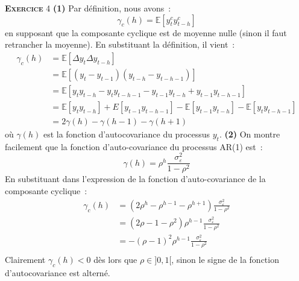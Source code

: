 \documentclass[10pt,a4paper,notitlepage,twocolumn]{article}
\newcommand{\exercice}[1]{\textsc{\textbf{Exercice}} #1}
\begin{document}
\exercice{4} \textbf{(1)} Par définition, nous avons :
\[
\gamma_c(h) = \mathbb E [y^c_ty^c_{t-h}]
\]
en supposant que la composante cyclique est de moyenne nulle (sinon il
faut retrancher la moyenne). En substituant la définition, il vient :
\[
  \begin{split}
    \gamma_c(h) &= \mathbb E [\Delta y_t \Delta y_{t-h}]\\
    &= \mathbb E [(y_t-y_{t-1})(y_{t-h}-y_{t-h-1})]\\
    &= \mathbb E [ y_ty_{t-h} - y_ty_{t-h-1} - y_{t-1}y_{t-h} + y_{t-1}y_{t-h-1} ]\\
    &= \mathbb E [ y_ty_{t-h}] + E [ y_{t-1}y_{t-h-1} ] - \mathbb E [ y_{t-1}y_{t-h}] - \mathbb E [ y_ty_{t-h-1} ] \\
    &= 2\gamma(h) - \gamma(h-1) - \gamma(h+1)
  \end{split}
\]
où $\gamma(h)$ est la fonction d'autocovariance du processus
$y_t$. \textbf{(2)} On montre facilement que la fonction
d'auto-covariance du processus AR(1) est :
\[
\gamma(h) = \rho^h\frac{\sigma_{\varepsilon}^2}{1-\rho^2}
\]
En substituant dans l'expression de la fonction d'auto-covariance de la composante cyclique :
\[
  \begin{split}
    \gamma_c(h) &= (2 \rho^h - \rho^{h-1} - \rho^{h+1})\frac{\sigma_{\varepsilon}^2}{1-\rho^2}\\
    &= (2 \rho - 1 - \rho^2)\rho^{h-1}\frac{\sigma_{\varepsilon}^2}{1-\rho^2}\\
    &= -(\rho-1)^2\rho^{h-1}\frac{\sigma_{\varepsilon}^2}{1-\rho^2}\\
  \end{split}
\]
Clairement $\gamma_c(h)<0$ dès lors que $\rho\in]0,1[$, sinon le signe
de la fonction d'autocovariance est alterné.
\end{document}
